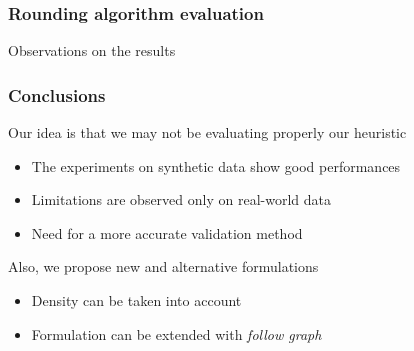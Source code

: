 \documentclass[aspectratio=169]{beamer}
\begin{document}
\begin{frame}[c]
	\frametitle{Rounding algorithm evaluation}
	Observations on the results
	\begin{itemize}
		      \begin{itemize}
		      \end{itemize}
	\end{itemize}
\end{frame}



\begin{frame}[c]
	\frametitle{Conclusions}
	Our idea is that we may not be evaluating properly our heuristic
	\begin{itemize}
		\item The experiments on synthetic data show good
		      performances
		\item Limitations are observed only on real-world data
		      \pause
		\item Need for a more accurate validation method
	\end{itemize}

	\pause
	\bigskip

	Also, we propose new and alternative formulations
	\begin{itemize}
		\pause
		\item Density can be taken into account
		      \pause
		\item Formulation can be extended with \emph{follow graph}
	\end{itemize}

\end{frame}

\end{document}

